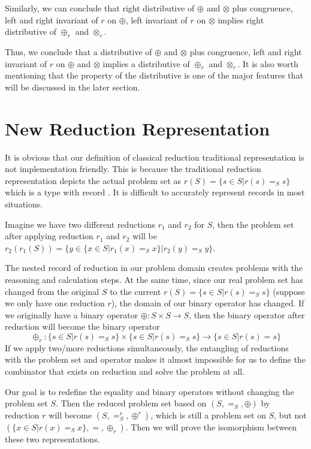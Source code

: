\documentclass[a4paper,12pt,twoside,openright]{report}
\begin{document}
Similarly, we can conclude that right distributive of $\oplus$ and $\otimes$ plus congruence, left and right invariant of $r$ on $\oplus$, left invariant of $r$ on $\otimes$ implies right distributive of $\oplus_r$ and $\otimes_r$.

Thus, we conclude that a distributive of $\oplus$ and $\otimes$ plus congruence, left and right invariant of $r$ on $\oplus$ and $\otimes$ implies a distributive of $\oplus_r$ and $\otimes_r$.
It is also worth mentioning that the property of the distributive is one of the major features that will be discussed in the later section.

\section{New Reduction Representation}
It is obvious that our definition of classical reduction traditional representation is not implementation friendly.
This is because the traditional reduction representation depicts the actual problem set as $r(S) = \{s\in S|r(s)=_S s\}$ which is a type with record . It is difficult to accurately represent records in most situations. 

Imagine we have two different reductions $r_1$ and $r_2$ for $S$, then the problem set after applying reduction $r_1$ and $r_2$ will be $r_2(r_1(S)) = \{y\in \{x \in S | r_1(x) =_S x\}|r_2(y)=_S y\}$. 

The nested  record of reduction in our problem domain creates problems with the reasoning and calculation steps. 
At the same time, since our real problem set has changed from the original $S$ to the current $r(S) = \{s\in S|r(s)=_S s\}$ (suppose we only have one reduction $r$), the domain of our binary operator has changed. If we originally have a binary operator $\oplus : S\times S \rightarrow S$, then the binary operator after reduction will become the binary operator \[\oplus_r : \{s\in S|r(s)=_S s\} \times \{s\in S|r(s)=_S s\} \rightarrow \{s\in S|r(s)= s\}\] If we apply two/more reductions simultaneously, the entangling of reductions with the problem set and operator makes it almost impossible for us to define the combinator that exists on reduction and solve the problem at all.

Our goal is to redefine the equality and binary operators without changing the problem set $S$. 
Then the reduced problem set based on $(S,=_S,\oplus)$ by reduction $r$ will become $(S,=^r_S,\oplus^r)$, which is still a problem set on $S$, but not $(\{x \in S | r(x) =_S x\}, =,\oplus_r)$. 
Then we will prove the isomorphism between these two representations.
\end{document}
